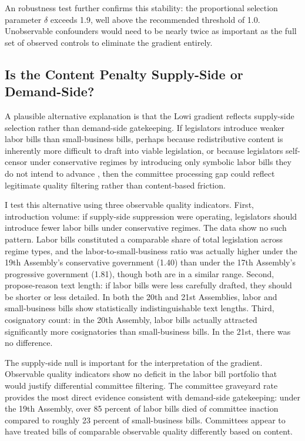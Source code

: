 \documentclass[11pt]{article}
\begin{document}
An \citet{oster2019} robustness test further confirms this stability: the proportional selection parameter $\delta$ exceeds 1.9, well above the recommended threshold of 1.0. Unobservable confounders would need to be nearly twice as important as the full set of observed controls to eliminate the gradient entirely.

\subsection{Is the Content Penalty Supply-Side or Demand-Side?}
\label{sec:results-supply}

A plausible alternative explanation is that the Lowi gradient reflects supply-side selection rather than demand-side gatekeeping. If legislators introduce weaker labor bills than small-business bills, perhaps because redistributive content is inherently more difficult to draft into viable legislation, or because legislators self-censor under conservative regimes by introducing only symbolic labor bills they do not intend to advance \citep{kang2025}, then the committee processing gap could reflect legitimate quality filtering rather than content-based friction.

I test this alternative using three observable quality indicators. First, introduction volume: if supply-side suppression were operating, legislators should introduce fewer labor bills under conservative regimes. The data show no such pattern. Labor bills constituted a comparable share of total legislation across regime types, and the labor-to-small-business ratio was actually higher under the 19th Assembly's conservative government (1.40) than under the 17th Assembly's progressive government (1.81), though both are in a similar range. Second, propose-reason text length: if labor bills were less carefully drafted, they should be shorter or less detailed. In both the 20th and 21st Assemblies, labor and small-business bills show statistically indistinguishable text lengths. Third, cosignatory count: in the 20th Assembly, labor bills actually attracted significantly more cosignatories than small-business bills. In the 21st, there was no difference.

The supply-side null is important for the interpretation of the gradient. Observable quality indicators show no deficit in the labor bill portfolio that would justify differential committee filtering. The committee graveyard rate provides the most direct evidence consistent with demand-side gatekeeping: under the 19th Assembly, over 85 percent of labor bills died of committee inaction compared to roughly 23 percent of small-business bills. Committees appear to have treated bills of comparable observable quality differently based on content.
\end{document}
